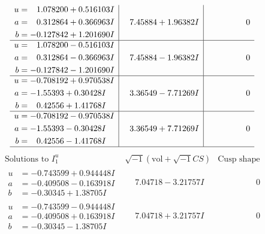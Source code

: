\documentclass[1p]{elsarticle_modified}
\theoremstyle{definition}
\newcommand{\I}{\sqrt{-1}}
\begin{document}
$$\begin{array}{c|c|c}
\begin{aligned}
u &= \phantom{-}1.078200 + 0.516103 I \\
a &= \phantom{-}0.312864 + 0.366963 I \\
b &= -0.127842 + 1.201690 I\end{aligned}
 & \phantom{-}7.45884 + 1.96382 I & \phantom{-0.000000 } 0 \\ \hline\begin{aligned}
u &= \phantom{-}1.078200 - 0.516103 I \\
a &= \phantom{-}0.312864 - 0.366963 I \\
b &= -0.127842 - 1.201690 I\end{aligned}
 & \phantom{-}7.45884 - 1.96382 I & \phantom{-0.000000 } 0 \\ \hline\begin{aligned}
u &= -0.708192 + 0.970538 I \\
a &= -1.55393 + 0.30428 I \\
b &= \phantom{-}0.42556 + 1.41768 I\end{aligned}
 & \phantom{-}3.36549 - 7.71269 I & \phantom{-0.000000 } 0 \\ \hline\begin{aligned}
u &= -0.708192 - 0.970538 I \\
a &= -1.55393 - 0.30428 I \\
b &= \phantom{-}0.42556 - 1.41768 I\end{aligned}
 & \phantom{-}3.36549 + 7.71269 I & \phantom{-0.000000 } 0\\
 \hline 
 \end{array}$$\newpage$$\begin{array}{c|c|c}  
\text{Solutions to }I^u_{1}& \I (\text{vol} + \sqrt{-1}CS) & \text{Cusp shape}\\
 \hline 
\begin{aligned}
u &= -0.743599 + 0.944448 I \\
a &= -0.409508 - 0.163918 I \\
b &= -0.30345 + 1.38705 I\end{aligned}
 & \phantom{-}7.04718 - 3.21757 I & \phantom{-0.000000 } 0 \\ \hline\begin{aligned}
u &= -0.743599 - 0.944448 I \\
a &= -0.409508 + 0.163918 I \\
b &= -0.30345 - 1.38705 I\end{aligned}
 & \phantom{-}7.04718 + 3.21757 I & \phantom{-0.000000 } 0 \\ \hline\begin{aligned}

\end{aligned}
\end{array}$$
\end{document}
